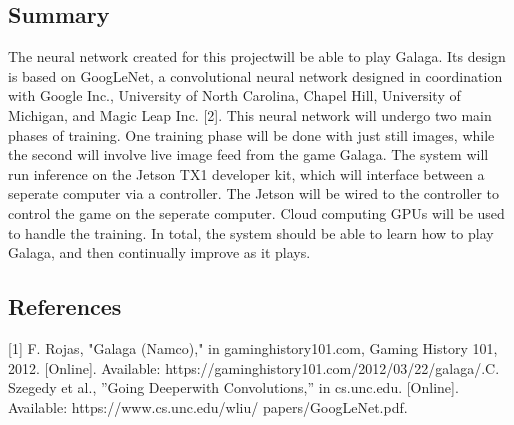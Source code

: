 \subsection{Summary}

The neural network created for this projectwill be able to play Galaga. Its design is based on GoogLeNet, a convolutional
neural network designed in coordination with Google Inc., University of North Carolina, Chapel Hill, University of
Michigan, and Magic Leap Inc. [2]. This neural network will undergo two main phases of training. One training phase
will be done with just still images, while the second will involve live image feed from the game Galaga. The system will
run inference on the Jetson TX1 developer kit, which will interface between a seperate computer via a controller. The
Jetson will be wired to the controller to control the game on the seperate computer. Cloud computing GPUs will be used
to handle the training. In total, the system should be able to learn how to play Galaga, and then continually improve as
it plays.

\subsection{References}

[1] F. Rojas, "Galaga (Namco)," in gaminghistory101.com, Gaming History 101, 2012. [Online]. Available: https://gaminghistory101.com/2012/03/22/galaga/.\newline
[2] C. Szegedy et al., ”Going Deeperwith Convolutions,” in cs.unc.edu. [Online]. Available: https://www.cs.unc.edu/wliu/
papers/GoogLeNet.pdf.

